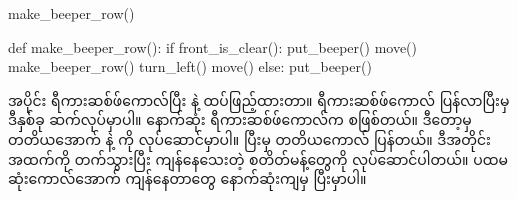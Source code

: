 %
\begin{py}
make_beeper_row()
\end{py}
%
%
\begin{py}
def make_beeper_row():
    if front_is_clear():
        put_beeper()
        move()
        make_beeper_row()
        turn_left()
        move()
    else:
        put_beeper()
\end{py}
%

  အပိုင်း ရီကားဆစ်ဖ်ကောလ်ပြီး   နဲ့  ထပ်ဖြည့်ထားတာ။  ရီကားဆစ်ဖ်ကောလ်  ပြန်လာပြီးမှ ဒီနှစ်ခု ဆက်လုပ်မှာပါ။  နောက်ဆုံး ရီကားဆစ်ဖ်ကောလ်က  စဖြစ်တယ်။ ဒီတော့မှ တတိယအောက်  နဲ့  ကို လုပ်ဆောင်မှာပါ။ ပြီးမှ တတိယကောလ်  ပြန်တယ်။ ဒီအတိုင်း အထက်ကို တက်သွားပြီး ကျန်နေသေးတဲ့ စတိတ်မန့်တွေကို လုပ်ဆောင်ပါတယ်။ ပထမဆုံးကောလ်အောက် ကျန်နေတာတွေ နောက်ဆုံးကျမှ ပြီးမှာပါ။

